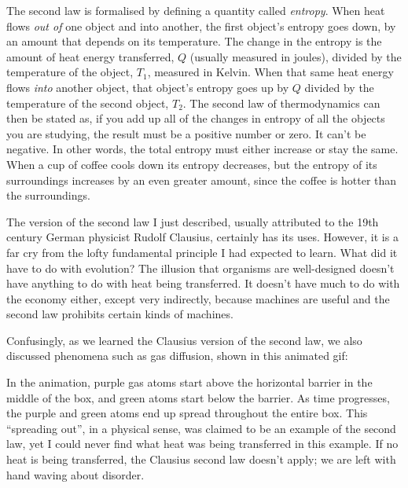 \documentclass[a4paper, 12pt]{article}
\begin{document}
The second law is formalised by defining a quantity called
{\em entropy}. When heat flows {\em out of} one object and into another,
the first object's entropy goes
down, by an amount that depends on its temperature.
The change in the entropy is the amount of heat energy transferred,
$Q$ (usually measured in joules),
divided by the temperature of the object, $T_1$, measured in Kelvin.
When that same heat energy flows {\em into} another object, that object's
entropy goes up by $Q$ divided by the temperature of the
second object, $T_2$. The second law of thermodynamics can then be stated as, if you
add up all of the changes in entropy of all the objects you are studying,
the result must be a positive number or zero. It can't be negative. In other
words, the total entropy must either increase or stay the same.
When a cup of coffee cools down its entropy decreases, but the entropy of its
surroundings increases by an even greater amount,
since the coffee is hotter than the surroundings.

The version of
the second law I just described, usually attributed to the 19th century
German physicist Rudolf Clausius, certainly has its uses. However, it is a far
cry from the lofty fundamental principle I had expected to learn. What did it
have to do with evolution? The illusion that organisms are well-designed
doesn't have
anything to do with heat being transferred. It doesn't have much to do
with the economy either, except very indirectly, because machines are useful
and the second law prohibits certain kinds of machines.

Confusingly, as we learned the Clausius version of the second law, we also
discussed phenomena such as gas diffusion, shown in this animated gif:

\begin{figure}[ht!]
\centering
{}
\end{figure}

In the animation, purple gas atoms start above the horizontal barrier in the
middle of the box, and green atoms start below the barrier.
As time progresses, the purple and green atoms end up spread throughout the entire
box. This ``spreading out'', in a physical sense, was claimed to be an example
of the second law, yet I could never find what heat was being transferred
in this example. If no heat is being transferred, the Clausius second law
doesn't apply; we are left with hand waving about disorder.
\end{document}
